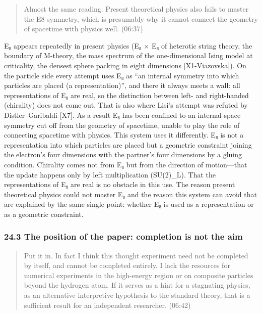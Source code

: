 \documentclass[
  a4paper,
]{article}
\begin{document}
\begin{quote}
Almost the same reading. Present theoretical physics also fails to
master the E8 symmetry, which is presumably why it cannot connect the
geometry of spacetime with physics well. (06:37)
\end{quote}

E₈ appears repeatedly in present physics (E₈ × E₈ of heterotic string
theory, the boundary of M-theory, the mass spectrum of the
one-dimensional Ising model at criticality, the densest sphere packing
in eight dimensions {[}X1-Viazovska{]}). On the particle side every
attempt uses E₈ as ``an internal symmetry into which particles are
placed (a representation)'', and there it always meets a wall: all
representations of E₈ are real, so the distinction between left- and
right-handed (chirality) does not come out. That is also where Lisi's
attempt was refuted by Distler--Garibaldi {[}X7{]}. As a result E₈ has
been confined to an internal-space symmetry cut off from the geometry of
spacetime, unable to play the role of connecting spacetime with physics.
This system uses it differently. E₈ is not a representation into which
particles are placed but a geometric constraint joining the electron's
four dimensions with the partner's four dimensions by a gluing
condition. Chirality comes not from E₈ but from the direction of
motion---that the update happens only by left multiplication (SU(2)\_L).
That the representations of E₈ are real is no obstacle in this use. The
reason present theoretical physics could not master E₈ and the reason
this system can avoid that are explained by the same single point:
whether E₈ is used as a representation or as a geometric constraint.

\subsubsection{24.3 The position of the paper: completion is not the
aim}\label{the-position-of-the-paper-completion-is-not-the-aim}

\begin{quote}
Put it in. In fact I think this thought experiment need not be completed
by itself, and cannot be completed entirely. I lack the resources for
numerical experiments in the high-energy region or on composite
particles beyond the hydrogen atom. If it serves as a hint for a
stagnating physics, as an alternative interpretive hypothesis to the
standard theory, that is a sufficient result for an independent
researcher. (06:42)
\end{quote}
\end{document}
